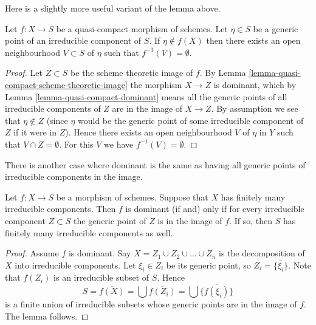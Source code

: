 \noindent
Here is a slightly more useful variant of the lemma above.

\begin{lemma}
\label{lemma-quasi-compact-generic-point-not-in-image}
Let $f : X \to S$ be a quasi-compact morphism of schemes.
Let $\eta \in S$ be a generic point of an irreducible
component of $S$. If $\eta \not \in f(X)$ then there
exists an open neighbourhood $V \subset S$ of $\eta$
such that $f^{-1}(V) = \emptyset$.
\end{lemma}

\begin{proof}
Let $Z \subset S$ be the scheme theoretic image of $f$.
By Lemma \ref{lemma-quasi-compact-scheme-theoretic-image}
the morphism $X \to Z$ is dominant, which by
Lemma \ref{lemma-quasi-compact-dominant}
means all the generic points of all irreducible components of $Z$
are in the image of $X \to Z$. By assumption we see that
$\eta \not \in Z$ (since $\eta$ would be the generic 
point of some irreducible component of $Z$ if it were in $Z$).
Hence there exists an open neighbourhood $V$ of $\eta$ in $Y$
such that $V \cap Z = \emptyset$. For this $V$ we have
$f^{-1}(V) = \emptyset$.
\end{proof}

\noindent
There is another case where dominant is the same as having all
generic points of irreducible components in the image.

\begin{lemma}
\label{lemma-dominant-finite-number-irreducible-components}
Let $f : X \to S$ be a morphism of schemes.
Suppose that $X$ has finitely many irreducible components.
Then $f$ is dominant (if and) only if for every irreducible
component $Z \subset S$ the generic point of $Z$ is in the
image of $f$. If so, then $S$ has finitely many irreducible
components as well.
\end{lemma}

\begin{proof}
Assume $f$ is dominant.
Say $X = Z_1 \cup Z_2 \cup \ldots \cup Z_n$ is the decomposition
of $X$ into irreducible components. Let $\xi_i \in Z_i$ be
its generic point, so $Z_i = \overline{\{\xi_i\}}$.
Note that $f(Z_i)$ is an irreducible subset of $S$.
Hence
$$
S = \overline{f(X)} = \bigcup \overline{f(Z_i)} =
\bigcup \overline{\{f(\xi_i)\}}
$$
is a finite union of irreducible subsets whose generic
points are in the image of $f$. The lemma follows.
\end{proof}






